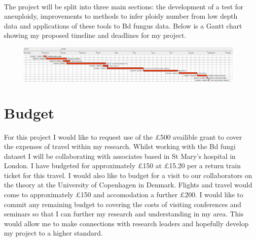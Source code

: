 \documentclass[11pt]{article}
\begin{document}
\paragraph{} The project will be split into three main sections: the development of a test for aneuploidy, improvements to methods to infer ploidy number from low depth data and applications of these tools to Bd fungus data. Below is a Gantt chart showing my proposed timeline and deadlines for my project.
\begin{figure}[H]
\begin{center}
\includegraphics[scale=0.28]{GanttChart.png}
\end{center}
\end{figure}
\section{Budget}
\paragraph{} For this project I would like to request use of the \pounds 500 availible grant to cover the expenses of travel within my research. Whilst working with the Bd fungi  dataset I will be collaborating with associates based in St Mary's hospital in London. I have budgeted for approximately \pounds 150 at \pounds 15.20 per a return train ticket for this travel. I would also like to budget for a visit to our collaborators on the theory at the University of Copenhagen in Denmark. Flights and travel would come to approximately \pounds 150 and accomodation a further \pounds 200. I would like to commit any remaining budget to covering the costs of visiting conferences and seminars so that I can further my research and understanding in my area. This would allow me to make connections with research leaders and hopefully develop my project to a higher standard.
\pagebreak 
\printbibliography
\end{document}
